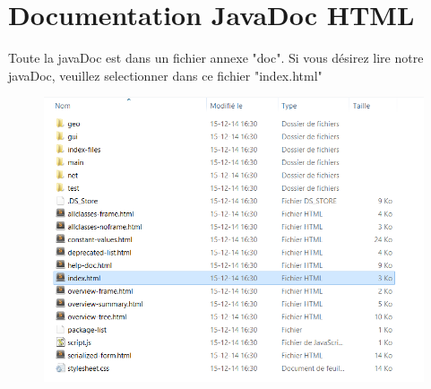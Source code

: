 \chapter{Documentation JavaDoc HTML}

Toute la javaDoc est dans un fichier annexe "doc". Si vous désirez lire notre javaDoc, veuillez selectionner dans ce fichier "index.html"

\begin{figure}[!h]
\begin{center}
\includegraphics[width=15cm]{./javadocIllustration}
\end{center}
\end{figure}